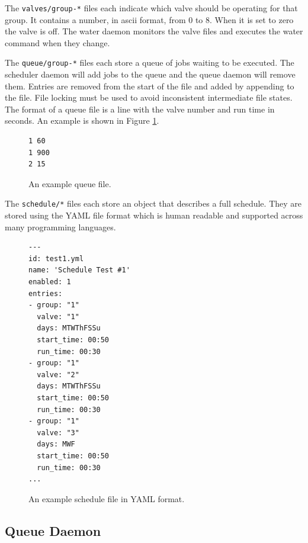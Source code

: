 \documentclass{article}
\begin{document}
The \verb+valves/group-*+ files each indicate which valve should be
operating for that group.
It contains a number, in ascii format, from 0 to 8.
When it is set to zero the valve is off.
The water daemon monitors the valve files and executes the water command
when they change.

The \verb+queue/group-*+ files each store a queue of jobs waiting to be
executed.
The scheduler daemon will add jobs to the queue and the queue daemon
will remove them.
Entries are removed from the start of the file and added by appending to
the file.
File locking must be used to avoid inconsistent intermediate file states.
The format of a queue file is a line with the valve number and run
time in seconds.  An example is shown in Figure \ref{fig:qf}.

\begin{figure}
\begin{center}
\begin{minipage}{2in}
\begin{verbatim}
1 60
1 900
2 15
\end{verbatim}
\end{minipage}
\end{center}
\caption{An example queue file.}
\label{fig:qf}
\end{figure}

The \verb+schedule/*+ files each store an object that describes a full
schedule.
They are stored using the YAML file format which is human readable
and supported across many programming languages.

\begin{figure}
\begin{center}
\begin{minipage}{3in}
\begin{verbatim}
---
id: test1.yml
name: 'Schedule Test #1'
enabled: 1
entries:
- group: "1"
  valve: "1"
  days: MTWThFSSu
  start_time: 00:50
  run_time: 00:30
- group: "1"
  valve: "2"
  days: MTWThFSSu
  start_time: 00:50
  run_time: 00:30
- group: "1"
  valve: "3"
  days: MWF
  start_time: 00:50
  run_time: 00:30
...
\end{verbatim}
\end{minipage}
\end{center}
\caption{An example schedule file in YAML format.}
\label{fig:sched}
\end{figure}

\FloatBarrier
\subsection{Queue Daemon}
\label{sec:queue}
\end{document}
